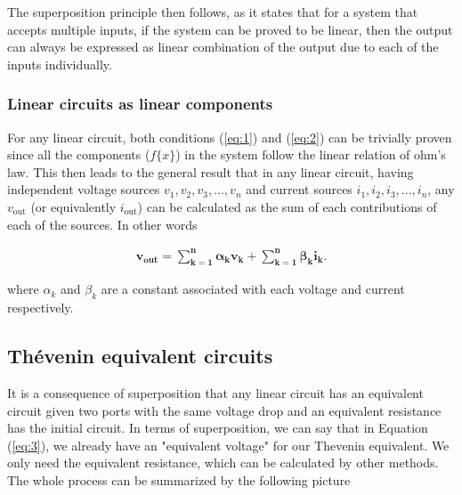 \documentclass[english,12pt]{article}
\begin{document}
The superposition principle then follows, as it states that for a system that accepts multiple inputs, if the system can be proved to be linear, then the output can always be expressed as linear combination of the output due to each of the inputs individually.

\subsubsection{Linear circuits as linear components}

For any linear circuit, both conditions (\ref{eq:1}) and (\ref{eq:2}) can be trivially proven since all the components ($f\{x\}$) in the system follow the linear relation of ohm's law. This then leads to the general result that in any linear circuit, having independent voltage sources $v_1,v_2,v_3,...,v_n$ and current sources $i_1,i_2,i_3,...,i_n$, any $v_\text{out}$ (or equivalently $i_\text{out}$) can be calculated as the sum of each contributions of each of the sources. In other words

\begin{align}
    \bm{v_\text{out} = \sum_{k=1}^n \alpha_k v_k +\sum_{k=1}^n \beta_k i_k.}\label{eq:3}
\end{align}

where $\alpha_k$ and $\beta_k$ are a constant associated with each voltage and current respectively.
\subsection{Thévenin equivalent circuits}

It is a consequence of superposition that any linear circuit has an equivalent circuit given two ports with the same voltage drop and an equivalent resistance has the initial circuit. In terms of superposition, we can say that in Equation (\ref{eq:3}), we already have an "equivalent voltage" for our Thevenin equivalent. We only need the equivalent resistance, which can be calculated by other methods. The whole process can be summarized by the following picture
\end{document}
